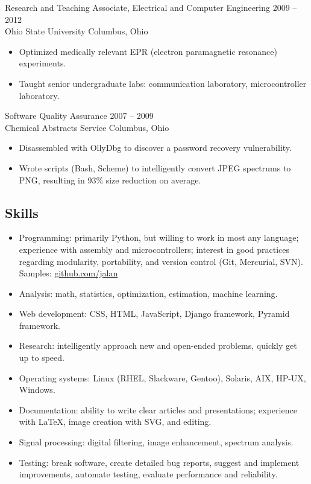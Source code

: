 \documentclass[12pt]{report}
\begin{document}
Research and Teaching Associate, Electrical and Computer Engineering \hfill 2009 -- 2012 \\
Ohio State University                                                \hfill Columbus, Ohio
\begin{itemize}
\item Optimized medically relevant EPR (electron paramagnetic resonance) experiments.
\item Taught senior undergraduate labs: communication laboratory, microcontroller laboratory.
\\
\end{itemize}

Software Quality Assurance                              \hfill 2007 -- 2009 \\
Chemical Abstracts Service                              \hfill Columbus, Ohio
\begin{itemize}
\item Disassembled with OllyDbg to discover a password recovery vulnerability.
\item Wrote scripts (Bash, Scheme) to intelligently convert JPEG spectrums to PNG, resulting in 93\% size reduction on average.
\end{itemize}

\subsection*{Skills}
\begin{itemize}
\item Programming: primarily Python, but willing to work in most any language; experience with assembly and microcontrollers; interest in good practices regarding modularity, portability, and version control (Git, Mercurial, SVN). Samples: \href{http://github.com/jalan}{github.com/jalan}
\item Analysis: math, statistics, optimization, estimation, machine learning.
\item Web development: CSS, HTML, JavaScript, Django framework, Pyramid framework.
\item Research: intelligently approach new and open-ended problems, quickly get up to speed.
\item Operating systems: Linux (RHEL, Slackware, Gentoo), Solaris, AIX, HP-UX, Windows.
\item Documentation: ability to write clear articles and presentations; experience with \LaTeX, image creation with SVG, and editing.
\item Signal processing: digital filtering, image enhancement, spectrum analysis.
\item Testing: break software, create detailed bug reports, suggest and implement improvements, automate testing, evaluate performance and reliability.
\end{itemize}
\end{document}
